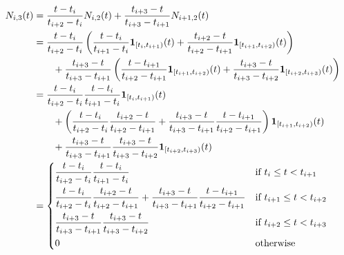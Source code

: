 \documentclass[a4paper,11pt]{article}
\begin{document}
\begin{align*}
  N_{i,3}(t) &= \frac{t-t_{i}}{t_{i+2}-t_{i}} N_{i,2}(t) + \frac{t_{i+3}-t}{t_{i+3}-t_{i+1}} N_{i+1,2}(t) \\
             &= \frac{t-t_{i}}{t_{i+2}-t_{i}}  
                \left( \frac{t-t_{i}}{t_{i+1}-t_{i}} \mathbf{1}_{[t_{i}, t_{i+1})}(t) + \frac{t_{i+2}-t}{t_{i+2}-t_{i+1}} \mathbf{1}_{[t_{i+1}, t_{i+2})}(t) \right) \\
             & \qquad{}  + \frac{t_{i+3}-t}{t_{i+3}-t_{i+1}} 
                \left( \frac{t-t_{i+1}}{t_{i+2}-t_{i+1}} \mathbf{1}_{[t_{i+1}, t_{i+2})}(t) + \frac{t_{i+3}-t}{t_{i+3}-t_{i+2}} \mathbf{1}_{[t_{i+2}, t_{i+3})}(t) \right)
             \\
             &= \frac{t-t_{i}}{t_{i+2}-t_{i}} \frac{t-t_{i}}{t_{i+1}-t_{i}} \mathbf{1}_{[t_{i}, t_{i+1})}(t) \\
             & \qquad{} + \left( \frac{t-t_{i}}{t_{i+2}-t_{i}} \frac{t_{i+2}-t}{t_{i+2}-t_{i+1}} + \frac{t_{i+3}-t}{t_{i+3}-t_{i+1}} \frac{t-t_{i+1}}{t_{i+2}-t_{i+1}} \right) \mathbf{1}_{[t_{i+1}, t_{i+2})}(t) \\
             & \qquad{} + \frac{t_{i+3}-t}{t_{i+3}-t_{i+1}} \frac{t_{i+3}-t}{t_{i+3}-t_{i+2}} \mathbf{1}_{[t_{i+2}, t_{i+3})}(t)
             \\
  &= \begin{dcases}
    \frac{t-t_{i}}{t_{i+2}-t_{i}} \frac{t-t_{i}}{t_{i+1}-t_{i}} & \text{if } t_{i} \leq t < t_{i+1} \\
    \frac{t-t_{i}}{t_{i+2}-t_{i}} \frac{t_{i+2}-t}{t_{i+2}-t_{i+1}} + \frac{t_{i+3}-t}{t_{i+3}-t_{i+1}} \frac{t-t_{i+1}}{t_{i+2}-t_{i+1}} & \text{if } t_{i+1} \leq t < t_{i+2} \\
    \frac{t_{i+3}-t}{t_{i+3}-t_{i+1}} \frac{t_{i+3}-t}{t_{i+3}-t_{i+2}} & \text{if } t_{i+2} \leq t < t_{i+3} \\
    0 & \text{otherwise}
  \end{dcases}
\end{align*}

\section{} %
\end{document}

